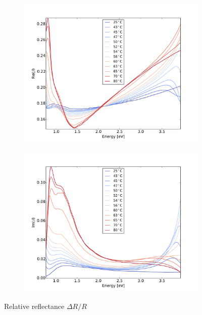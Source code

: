 \begin{figure}
    \begin{subfigure}[b]{0.49\textwidth}
        \centering
        \includegraphics[width=\textwidth]{Results/Sim1/re_beta.pdf}
        \caption{}
        \label{fig:2}
    \end{subfigure}
    \begin{subfigure}[b]{0.49\textwidth}
        \centering
        \includegraphics[width=\textwidth]{Results/Sim1/im_beta.pdf}
        \caption{}
        \label{fig:2}
    \end{subfigure}
    \caption{Relative reflectance $\Delta R/R$}
    \label{fig:}
\end{figure}
%


